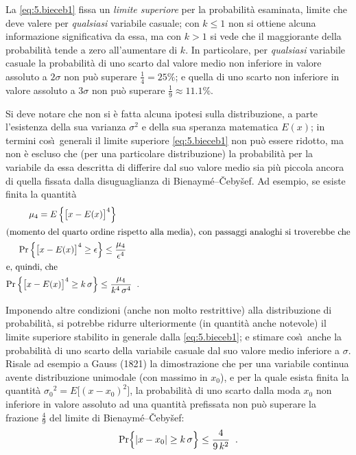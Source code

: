 La \eqref{eq:5.bieceb1} fissa un \emph{limite superiore} per
la probabilit\`a esaminata, limite che deve valere per
\emph{qualsiasi} variabile casuale; con $k \leq 1$ non si
ottiene alcuna informazione significativa da essa, ma con $k
> 1$ si vede che il maggiorante della probabilit\`a tende a
zero all'aumentare di $k$.  In particolare, per
\emph{qualsiasi} variabile casuale la probabilit\`a di uno
scarto dal valore medio non inferiore in valore assoluto a
$2 \sigma$ non pu\`o superare $\frac{1}{4} = 25\%$; e quella
di uno scarto non inferiore in valore assoluto a $3 \sigma$
non pu\`o superare $\frac{1}{9} \approx 11.1\%$.

Si deve notare che non si \`e fatta alcuna ipotesi sulla
distribuzione, a parte l'esistenza della sua varianza
$\sigma^2$ e della sua speranza matematica $E(x)$; in
termini cos\`\i\ generali il limite superiore
\eqref{eq:5.bieceb1} non pu\`o essere ridotto, ma non \`e
escluso che (per una particolare distribuzione) la
probabilit\`a per la variabile da essa descritta di
differire dal suo valore medio sia pi\`u piccola ancora di
quella fissata dalla disuguaglianza di Bienaym\'e--\v Ceby\v
sef.  Ad esempio, se esiste finita la quantit\`a
\begin{gather*}
  \mu_4 = E \left\{ \bigl[ x - E(x) \bigr]^4
    \right\} \\
  \intertext{(momento del quarto ordine rispetto
    alla media), con passaggi analoghi si troverebbe
    che}
  \Pr \left\{ \bigl[ x - E(x) \bigr]^4 \geq
    \epsilon \right\} \leq \frac{\mu_4}{\epsilon^4} \\
  \intertext{e, quindi, che}
  \Pr \left\{ \bigl[ x - E(x) \bigr]^4 \geq
    k \, \sigma \right\} \leq \frac{\mu_4}{k^4 \,
   \sigma^4} \;\; .
\end{gather*}

Imponendo altre condizioni (anche non molto restrittive)
alla distribuzione di probabilit\`a, si potrebbe ridurre
ulteriormente (in quantit\`a anche notevole) il limite
superiore stabilito in generale dalla \eqref{eq:5.bieceb1};
e stimare cos\`\i\ anche la probabilit\`a di uno scarto
della variabile casuale dal suo valore medio inferiore a
$\sigma$.  Risale ad esempio a Gauss%
(1821) la dimostrazione che per una variabile continua
avente distribuzione unimodale (con massimo in $x_0$), e per
la quale esista finita la quantit\`a ${\sigma_0}^2 = E
\bigl[ ( x - x_0 )^2 \bigr]$, la probabilit\`a di uno scarto
dalla moda $x_0$ non inferiore in valore assoluto ad una
quantit\`a prefissata non pu\`o superare la frazione
$\frac{4}{9}$ del limite di Bienaym\'e--\v Ceby\v sef:
\begin{equation*}
  \Pr \Bigl\{ \left| x - x_0 \right| \geq k \,
    \sigma \Bigr\} \leq \frac{4}{9 \, k^2} \;\; .
\end{equation*}

